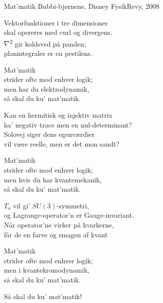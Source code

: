 \begin{song}{Mat'matik}
  {} %
  {Bubbi-bjørnene, Disney} %
  {} %
  {FysikRevy, 2008} %
  {\NotCCLIed} %

  \begin{SBVerse}
    Vektorfunktioner i tre dimensioner\\
    skal opereres med curl og divergens.\\
    $\nabla$\textsuperscript{2} gir koldsved på panden;\\
    planintegraler er en pestilens.
  \end{SBVerse}

  \begin{SBChorus}
    Mat'matik\\
    strider ofte mod enhver logik;\\
    men har du elektrodynamik,\\
    så skal du ku' mat'matik.
  \end{SBChorus}

  \begin{SBVerse}
    Kan en hermitisk og injektiv matrix\\
    ha' negativ trace men en nul-determinant?\\
    Solovej siger dens egenværdier\\
    vil være reelle, men er det mon sandt?
  \end{SBVerse}

  \begin{SBChorus}
    Mat'matik\\
    strider ofte mod enhver logik;\\
    men hvis du har kvantemekanik,\\
    så skal du ku' mat'matik.
  \end{SBChorus}

  \begin{SBVerse}
    $T_a$ vil gi' $SU(3)$-symmetri,\\
    og Lagrange-operator'n er Gauge-invariant.\\
    Når operator'ne virker på kvarkerne,\\
    får de en farve og smagen af kvant
  \end{SBVerse}

  \begin{SBChorus}
    Mat'matik\\
    strider ofte mod enhver logik;\\
    men i kvantekromodynamik,\\
    så skal du ku' mat'matik.
  \end{SBChorus}

  \begin{SBSection*}
    Så skal du ku' mat'matik!
  \end{SBSection*}
\end{song}